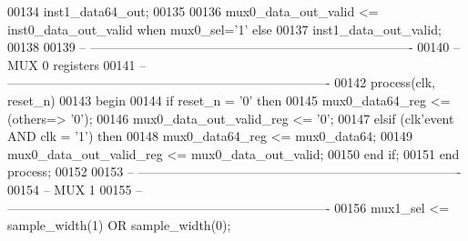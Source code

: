 \begin{DoxyCode}
00134                         inst1\_data64\_out;
00135                
00136 \textcolor{vhdlchar}{mux0_data_out_valid}     \textcolor{vhdlchar}{<=} \textcolor{vhdlchar}{inst0_data_out_valid} \textcolor{keywordflow}{when} \textcolor{vhdlchar}{mux0_sel}\textcolor{vhdlchar}{=}\textcolor{vhdlchar}{'}\textcolor{vhdllogic}{}\textcolor{vhdllogic}{1}\textcolor{vhdlchar}{'} \textcolor{keywordflow}{else} 
00137                         inst1\_data\_out\_valid;
00138 
00139 \textcolor{keyword}{-- ----------------------------------------------------------------------------}
00140 \textcolor{keyword}{-- MUX 0 registers}
00141 \textcolor{keyword}{-- ----------------------------------------------------------------------------}
00142 \textcolor{keywordflow}{process}(clk, reset_n)
00143 \textcolor{vhdlkeyword}{begin }
00144    \textcolor{keywordflow}{if} \textcolor{vhdlchar}{reset_n} \textcolor{vhdlchar}{=} \textcolor{vhdlchar}{'}\textcolor{vhdllogic}{}\textcolor{vhdllogic}{0}\textcolor{vhdlchar}{'} \textcolor{keywordflow}{then} 
00145       \textcolor{vhdlchar}{mux0_data64_reg}         \textcolor{vhdlchar}{<=} \textcolor{vhdlchar}{(}\textcolor{keywordflow}{others}\textcolor{vhdlchar}{=}\textcolor{vhdlchar}{>} \textcolor{vhdlchar}{'}\textcolor{vhdllogic}{}\textcolor{vhdllogic}{0}\textcolor{vhdlchar}{'}\textcolor{vhdlchar}{)};
00146       \textcolor{vhdlchar}{mux0_data_out_valid_reg} \textcolor{vhdlchar}{<=} \textcolor{vhdlchar}{'}\textcolor{vhdllogic}{}\textcolor{vhdllogic}{0}\textcolor{vhdlchar}{'};
00147    \textcolor{keywordflow}{elsif} \textcolor{vhdlchar}{(}\textcolor{vhdlchar}{clk}\textcolor{vhdlchar}{'}\textcolor{vhdlkeyword}{event} \textcolor{keywordflow}{AND} \textcolor{vhdlchar}{clk} \textcolor{vhdlchar}{=} \textcolor{vhdlchar}{'}\textcolor{vhdllogic}{}\textcolor{vhdllogic}{1}\textcolor{vhdlchar}{'}\textcolor{vhdlchar}{)} \textcolor{keywordflow}{then} 
00148       \textcolor{vhdlchar}{mux0_data64_reg}         \textcolor{vhdlchar}{<=} \textcolor{vhdlchar}{mux0_data64};
00149       \textcolor{vhdlchar}{mux0_data_out_valid_reg} \textcolor{vhdlchar}{<=} \textcolor{vhdlchar}{mux0_data_out_valid};
00150    \textcolor{keywordflow}{end} \textcolor{keywordflow}{if};
00151 \textcolor{keywordflow}{end} \textcolor{keywordflow}{process};
00152 
00153 \textcolor{keyword}{-- ----------------------------------------------------------------------------}
00154 \textcolor{keyword}{-- MUX 1 }
00155 \textcolor{keyword}{-- ----------------------------------------------------------------------------}
00156 \textcolor{vhdlchar}{mux1_sel}                \textcolor{vhdlchar}{<=} \textcolor{vhdlchar}{sample_width}\textcolor{vhdlchar}{(}\textcolor{vhdllogic}{}\textcolor{vhdllogic}{1}\textcolor{vhdlchar}{)} \textcolor{keywordflow}{OR} \textcolor{vhdlchar}{sample_width}\textcolor{vhdlchar}{(}\textcolor{vhdllogic}{}\textcolor{vhdllogic}{0}\textcolor{vhdlchar}{)};

\end{DoxyCode}
